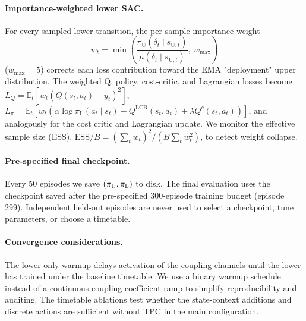 \paragraph{Importance-weighted lower SAC.}
For every sampled lower transition, the per-sample importance weight
\[
w_t = \min\!\left(\frac{\bar{\pi}_{\mathrm U}(\delta_{t} \mid s_{\mathrm U,t})}{\mu(\delta_{t} \mid s_{\mathrm U,t})},\ w_{\max}\right)
\]
($w_{\max} = 5$) corrects each loss contribution toward the EMA "deployment" upper distribution.
The weighted Q, policy, cost-critic, and Lagrangian losses become $L_Q = \mathbb{E}_t[w_t (Q(s_t, a_t) - y_t)^2]$,
$L_\pi = \mathbb{E}_t[w_t (\alpha \log \pi_{\mathrm L}(a_t\mid s_t) - Q^{\mathrm{LCB}}(s_t, a_t) + \lambda Q^c(s_t, a_t))]$, and analogously for the cost critic and Lagrangian update.
We monitor the effective sample size (ESS), $\mathrm{ESS}/B = (\sum_t w_t)^2 / (B \sum_t w_t^2)$, to detect weight collapse.

\paragraph{Pre-specified final checkpoint.}
Every $50$ episodes we save $(\pi_{\mathrm{U}}, \pi_{\mathrm{L}})$ to disk. The final evaluation uses the checkpoint saved after the pre-specified 300-episode training budget (episode 299). Independent held-out episodes are never used to select a checkpoint, tune parameters, or choose a timetable.

\paragraph{Convergence considerations.}
The lower-only warmup delays activation of the coupling channels until the lower has trained under the baseline timetable.
We use a binary warmup schedule instead of a continuous coupling-coefficient ramp to simplify reproducibility and auditing. The timetable ablations test whether the state-context additions and discrete actions are sufficient without TPC in the main configuration.
